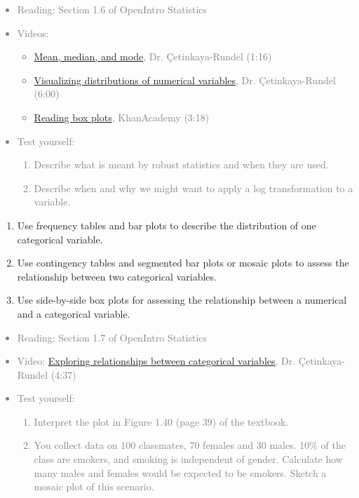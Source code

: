 \documentclass[11pt]{article}
\newcommand{\gray}[1]{\textcolor{gray}{#1}}
\begin{document}
\gray{
{\it
\vspace{-0.75cm}
\begin{itemize}
\renewcommand{\labelitemi}{{\textcolor{dark}{$\ast$}}}
\item Reading: Section 1.6 of OpenIntro Statistics
\item Videos:
\begin{itemize}
\item \href{http://youtu.be/FUIJruaneIc}{Mean, median, and mode}, Dr. \c{C}etinkaya-Rundel (1:16)
\item \href{http://youtu.be/ME_k8JY58f4}{Visualizing distributions of numerical variables}, Dr. \c{C}etinkaya-Rundel (6:00)
\item \href{http://www.khanacademy.org/math/statistics/v/reading-box-and-whisker-plots}{Reading box plots}, KhanAcademy (3:18)
\end{itemize}
\item Test yourself: 
\begin{enumerate}
\item Describe what is meant by robust statistics and when they are used.
\item Describe when and why we might want to apply a log transformation to a variable. \\
\end{enumerate}
\end{itemize}
}}


%

\begin{enumerate}[resume]
\renewcommand\labelenumi{\textcolor{light}{\textbf{LO \theenumi.}}}
\item Use frequency tables and bar plots to describe the distribution of one categorical variable.
\item Use contingency tables and segmented bar plots or mosaic plots to assess the relationship between two categorical variables.
\item Use side-by-side box plots for assessing the relationship between a numerical and a categorical variable.
\end{enumerate}

\gray{
{\it
\vspace{-0.75cm}
\begin{itemize}
\renewcommand{\labelitemi}{{\textcolor{dark}{$\ast$}}}
\item Reading: Section 1.7 of OpenIntro Statistics
\item Video: \href{http://youtu.be/zLHunbpH5Hg}{Exploring relationships between categorical variables}, Dr. \c{C}etinkaya-Rundel (4:37)
\item Test yourself: 
\begin{enumerate}
\item Interpret the plot in Figure 1.40 (page 39) of the textbook.
\item You collect data on 100 classmates, 70 females and 30 males. 10\% of the class are smokers, and smoking is independent of gender. Calculate how many males and females would be expected to be smokers. Sketch a mosaic plot of this scenario. \\
\end{enumerate}
\end{itemize}
}}
\end{document}
